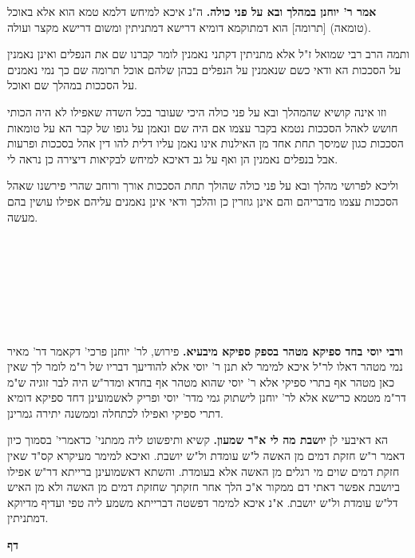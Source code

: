 \documentclass[12pt, openany]{book}
\newcommand{\sethebfont}{
\fontsize{10.5pt}{21.0pt} \selectfont
}
\newcommand{\twocol}[1]{
	{\sethebfont \begin{multicols}{2}
			#1
	\end{multicols}}	
}
\newcommand{\textblock}[1]{
{\sethebfont #1\\}	
}
\newcommand{\chapname}{}
\newcommand{\newchap}[1]{
	\addcontentsline{toc}{chapter}{#1}
	\renewcommand{\chapname}{#1}
		\begin{center}
			\textbf{%
\fontsize{16pt}{16pt}\selectfont
				#1}
		\end{center}
}
\begin{document}
{\par\textbf{אמר ר' יוחנן במהלך ובא על פני כולה.}  ה"נ איכא למיחש דלמא טמא הוא אלא באוכל (טומאה) [תרומה] הוא דמתוקמא דומיא דרישא דמתניתין ומשום דרישא מקצר ועולה.\par  ותמה הרב רבי שמואל ז"ל אלא מתניתין דקתני נאמנין לומר קברנו שם את הנפלים ואינן נאמנין על הסככות הא ודאי כשם שנאמנין על הנפלים בכהן שלהם אוכל תרומה שם כך נמי נאמנים על הסככות במהלך שם ואוכל.\par  וזו אינה קושיא שהמהלך ובא על פני כולה היכי שעובר בכל השדה שאפילו לא היה הכותי חושש לאהל הסככות נטמא בקבר עצמו אם היה שם ונאמן על גופו של קבר הא על טומאות הסככות כגון שמיסך תחת אחד מן האילנות אינו נאמן עליו דלית להו דין אהל בסככות ופרעות אבל בנפלים נאמנין הן ואף על גב דאיכא למיחש לבקיאות דיצירה כן נראה לי.\par  וליכא לפרושי מהלך ובא על פני כולה שהולך תחת הסככות אורך ורוחב שהרי פירשנו שאהל הסככות עצמו מדבריהם והם אינן גוזרין כן והלכך ודאי אינן נאמנים עליהם אפילו עושין בהם מעשה. 
\par}
\textblock{}{}
\textblock{}{}
\textblock{}{}
\textblock{}{}
\twocol{\textbf{ורבי יוסי בחד ספיקא מטהר בספק ספיקא מיבעיא.}  פירוש, לר' יוחנן פרכי' דקאמר דר' מאיר נמי מטהר דאלו לר"ל איכא למימר לא תנן ר' יוסי אלא להודיעך דבריו של ר"מ לומר לך שאין כאן מטהר אף בתרי ספיקי אלא ר' יוסי שהוא מטהר אף בחדא ומדר"ש היה לבר זוגיה ש"מ דר"מ מטמא כרישא אלא לר' יוחנן לישתוק גמי מדר' יוסי ופריק לאשמועינן דחד ספיקא דומיא דתרי ספיקי ואפילו לכתחלה וממשנה יתירה גמרינן. 
\par הא דאיבעי לן \textbf{יושבת מה לי א"ר שמעון.}  קשיא ותיפשוט ליה ממתני' כדאמרי' בסמוך כיון דאמר ר"ש חזקת דמים מן האשה ל"ש עומדת ול"ש יושבת. ואיכא למימר מעיקרא קס"ד שאין חזקת דמים שוים מי רגלים מן האשה אלא בעומדת. והשתא דאשמועינן ברייתא דר"ש אפילו ביושבת אפשר דאתי דם ממקור א"כ הלך אחר חזקתך שחזקת דמים מן האשה ולא מן האיש דל"ש עומדת ול"ש יושבת. א"נ איכא למימר דפשטה דברייתא משמע ליה טפי ועדיף מדיוקא דמתניתין. 
\par}
\newchap{דף }
\end{document}
